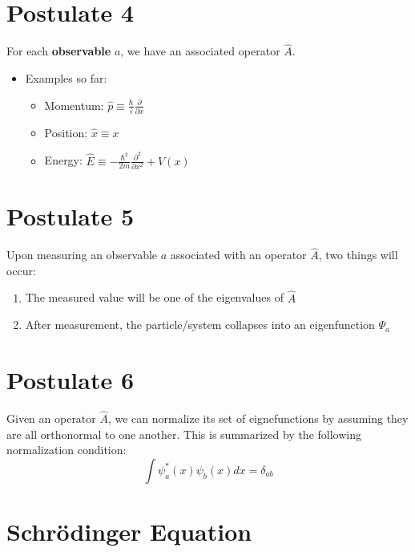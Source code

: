 \documentclass{article}
\begin{document}
\section*{Postulate 4}
For each \textbf{observable} $a$, we have an associated operator $\hat{A}$.
\begin{itemize}
    \item Examples so far:
        \begin{itemize}
            \item Momentum: $\hat{p}\equiv\frac{\hbar}{i}\frac{\partial}{\partial x}$
            \item Position: $\hat{x}\equiv x$
            \item Energy: $\hat{E}\equiv -\frac{\hbar^2}{2m}\frac{\partial^2}{\partial x^2} + V(x)$
        \end{itemize}
\end{itemize}
\section*{Postulate 5}
Upon measuring an observable $a$ associated with an operator $\hat{A}$, two things will occur:
\begin{enumerate}
    \item The measured value will be one of the eigenvalues of $\hat{A}$
    \item After measurement, the particle/system collapses into an eigenfunction $\Psi_a$
\end{enumerate}
\section*{Postulate 6}
Given an operator $\hat{A}$, we can normalize its set of eignefunctions by assuming they are all orthonormal to one another. This is summarized by the following normalization condition:
\begin{equation}
    \int{\psi_a^*(x) \psi_b(x) dx} = \delta_{ab}
\end{equation}
\section*{Schr\"{o}dinger Equation}
\end{document}
